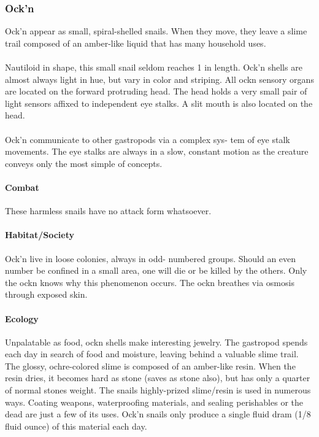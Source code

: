 \subsubsection{Ock'n}

Ock'n appear as small, spiral-shelled snails. When they move,
they leave a slime trail composed of an amber-like liquid that
has many household uses.\\
\\
Nautiloid in shape, this small snail seldom reaches 1 in
length. Ock'n shells are almost always light in hue, but vary in
color and striping. All ockn sensory organs are located on the
forward protruding head. The head holds a very small pair of
light sensors affixed to independent eye stalks. A slit mouth is
also located on the head.\\
\\
Ock'n communicate to other gastropods via a complex sys-
tem of eye stalk movements. The eye stalks are always in a
slow, constant motion as the creature conveys only the most
simple of concepts.

\paragraph{Combat}
 These harmless snails have no attack form whatsoever.

\paragraph{Habitat/Society}
Ock'n live in loose colonies, always in odd- numbered groups.
Should an even number be confined in a small area, one will
die or be killed by the others. Only the ockn knows why this
phenomenon occurs. The ockn breathes via osmosis through exposed
skin.

\paragraph{Ecology}
Unpalatable as food, ockn shells make interesting jewelry.
The gastropod spends each day in search of food and moisture,
leaving behind a valuable slime trail. The glossy,
ochre-colored slime is composed of an amber-like resin. When
the resin dries, it becomes hard as stone (saves as stone also),
but has only a quarter of normal stones weight. The snails
highly-prized slime/resin is used in numerous ways. Coating
weapons, waterproofing materials, and sealing perishables or
the dead are just a few of its uses. Ock'n snails only produce a
single fluid dram (1/8 fluid ounce) of this material each day.

